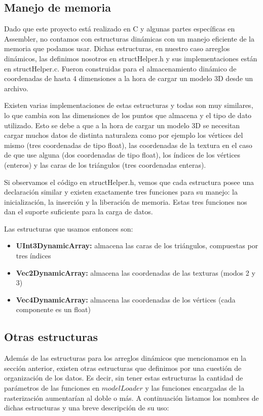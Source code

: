 \documentclass[a4paper]{article}
\begin{document}
\subsection{Manejo de memoria}
Dado que este proyecto está realizado en C y algunas partes específicas en Assembler, no contamos con estructuras dinámicas con un manejo eficiente de la memoria que podamos usar. Dichas estructuras, en nuestro caso arreglos dinámicos, las definimos nosotros en structHelper.h y sus implementaciones están en structHelper.c. Fueron construidas para el almacenamiento dinámico de coordenadas de hasta 4 dimensiones a la hora de cargar un modelo 3D desde un archivo.
\par Existen varias implementaciones de estas estructuras y todas son muy similares, lo que cambia son las dimensiones de los puntos que almacena y el tipo de dato utilizado. Esto se debe a que a la hora de cargar un modelo 3D se necesitan cargar muchos datos de distinta naturaleza como por ejemplo los vértices del mismo (tres coordenadas de tipo float), las coordenadas de la textura en el caso de que use alguna (dos coordenadas de tipo float), los índices de los vértices (enteros) y las caras de los triángulos (tres coordenadas enteras).
\par Si observamos el código en structHelper.h, vemos que cada estructura posee una declaración similar y existen exactamente tres funciones para su manejo: la inicialización, la inserción y la liberación de memoria. Estas tres funciones nos dan el suporte suficiente para la carga de datos.

Las estructuras que usamos entonces son:
\begin{itemize}
\item \textbf{UInt3DynamicArray: } almacena las caras de los triángulos, compuestas por tres índices
\item \textbf{Vec2DynamicArray: } almacena las coordenadas de las texturas (modos 2 y 3)
\item \textbf{Vec4DynamicArray: } almacena las coordenadas de los vértices (cada componente es un float)
\end{itemize}

\subsection{Otras estructuras}
Además de las estructuras para los arreglos dinámicos que mencionamos en la sección anterior, existen otras estructuras que definimos por una cuestión de organización de los datos. Es decir, sin tener estas estructuras la cantidad de parámetros de las funciones en $modelLoader$ y las funciones encargadas de la rasterización aumentarían al doble o más. A continuación listamos los nombres de dichas estructuras y una breve descripción de su uso:
\end{document}
